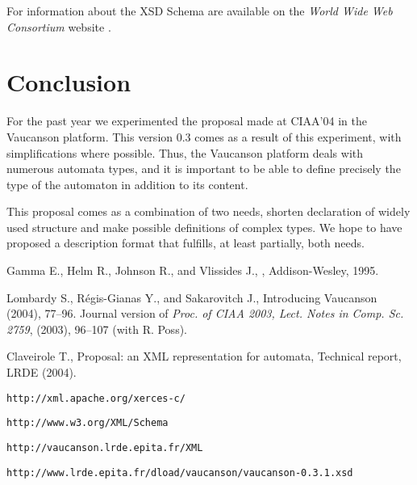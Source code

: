 \documentclass[a4paper]{article}
\newcommand{\Vauc}{{\sc Vaucanson}\xspace}
\begin{document}
For information about the XSD Schema are available on the
\textit{World Wide Web Consortium} website \cite{W3C}.

\section{Conclusion}

For the past year we experimented the proposal made at CIAA'04 in the
\Vauc platform. This version 0.3 comes as a result of this experiment,
with simplifications where possible. Thus, the \Vauc platform deals
with numerous automata types, and it is important to be able to define
precisely the type of the automaton in addition to its content.

This proposal comes as a combination of two needs, shorten declaration
of widely used structure and make possible definitions of complex
types. We hope to have proposed a description format that fulfills, at
least partially, both needs.

{\small%
\begin{thebibliography}{1}

{\sc Gamma E., Helm R., Johnson R., and Vlissides J.},
,
\newblock Addison-Wesley, 1995.

{\sc Lombardy S., R\'egis-Gianas Y., and Sakarovitch J.},
\newblock Introducing Vaucanson
 (2004), 77--96.
\newblock Journal version of
{\em Proc. of CIAA 2003, Lect. Notes in Comp. Sc. 2759}, (2003),
96--107
\newblock (with {\sc R. Poss}).

{\sc Claveirole T.},
\newblock Proposal: an XML representation for automata,
\newblock Technical report, LRDE (2004).


\verb+http://xml.apache.org/xerces-c/+

\verb+http://www.w3.org/XML/Schema+

\verb+http://vaucanson.lrde.epita.fr/XML+

\verb+http://www.lrde.epita.fr/dload/vaucanson/vaucanson-0.3.1.xsd+
\end{thebibliography}}
\end{document}
